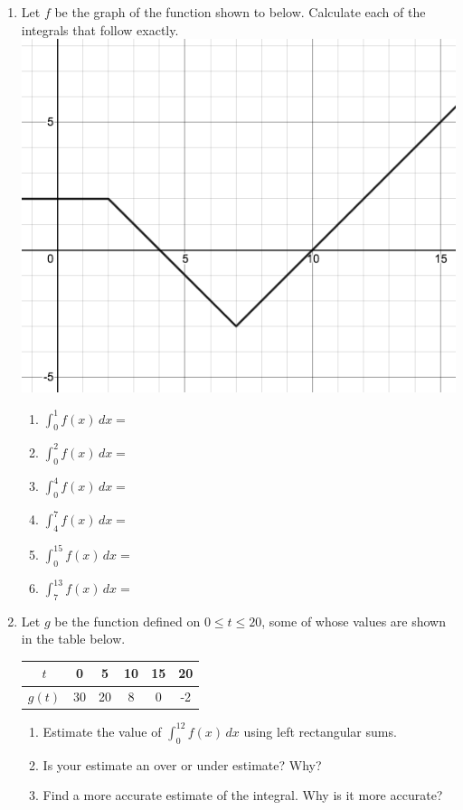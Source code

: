 \documentclass[12pt]{article}
\begin{document}
\begin{enumerate}
\item Let $f$ be the graph of the function shown to below. Calculate each of the integrals that follow exactly.\\
\includegraphics [scale=.35]{5_2_g4}\\
	
	\begin{enumerate}
	\item $\displaystyle \int_0^1f(x)\,dx=$

	\item$\displaystyle \int_0^2f(x)\,dx=$
	\item $\displaystyle \int_0^4f(x)\,dx=$
	\item$\displaystyle \int_4^7f(x)\,dx=$
	\item $\displaystyle \int_0^15f(x)\,dx=$
	\item$\displaystyle \int_7^13f(x)\,dx=$
	\end{enumerate}


\item Let $g$ be the function defined on $0\leq t\leq 20$, some of whose values are shown in the table below.\\
 
\begin{tabular}{c|ccccc}
$t$ & 0 &5  & 10 & 15&20 \\
\hline
$g(t)$ & 30 & 20 &8  &0&-2  \\
\end{tabular}

	\begin{enumerate}
	\item Estimate the value of $\displaystyle \int_0^{12} f(x)\,dx$ using left rectangular sums.\\
	\vfill
	\item Is your estimate an over or under estimate? Why?\\
		\vfill
	\item Find a more accurate estimate of the integral. Why is it more accurate?\\
		\vfill
	\end{enumerate}
\end{enumerate}
\end{document}
